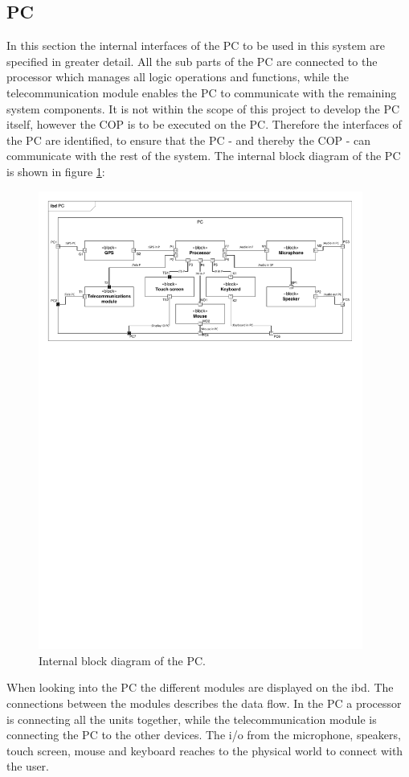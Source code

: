 \subsection{PC}
In this section the internal interfaces of the PC to be used in this system are specified in greater detail. All the sub parts of the PC are connected to the processor which manages all logic operations and functions, while the telecommunication module enables the PC to communicate with the remaining system components. It is not within the scope of this project to develop the PC itself, however the COP is to be executed on the PC. Therefore the interfaces of the PC are identified, to ensure that the PC - and thereby the COP - can communicate with the rest of the system. The internal block diagram of the PC is shown in figure \ref{fig:internal_diagram_PC}:
\begin{figure}[H]
\centering
\includegraphics[width=0.95\textwidth]
{billeder/ibd_PC.pdf}
\caption{Internal block diagram of the PC.}
\label{fig:internal_diagram_PC}
\end{figure}
When looking into the PC the different modules are displayed on the ibd. The connections between the modules describes the data flow. In the PC a processor is connecting all the units together, while the telecommunication module is connecting the PC to the other devices. The i/o from the microphone, speakers, touch screen, mouse and keyboard reaches to the physical world to connect with the user.



